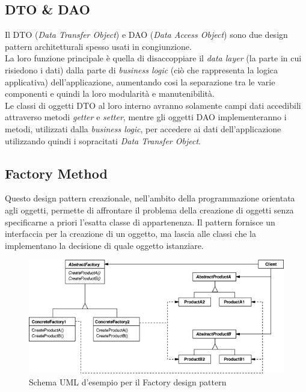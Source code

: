\documentclass[12pt,a4paper,twoside,openany,english]{book}
\begin{document}
\subsection{DTO \& DAO}
Il \gls{DTO} (\textit{Data Transfer Object}) e \gls{DAO} (\textit{Data Access Object}) sono due design pattern architetturali spesso usati in congiunzione.\\
La loro funzione principale è quella di disaccoppiare il \textit{data layer} (la parte in cui risiedono i dati) dalla parte di \textit{business logic} (ciò che rappresenta la logica applicativa) dell'applicazione, aumentando cosi la separazione tra le varie componenti e quindi la loro modularità e manutenibilità.\\
Le classi di oggetti \gls{DTO} al loro interno avranno solamente campi dati accedibili attraverso metodi \textit{getter} e \textit{setter}, mentre gli oggetti \gls{DAO} implementeranno i metodi, utilizzati dalla \textit{business logic}, per accedere ai dati dell'applicazione utilizzando quindi i sopracitati \textit{Data Transfer Object}.

\subsection{Factory Method} \label{factory}
Questo design pattern creazionale, nell'ambito della programmazione orientata agli oggetti, permette di affrontare il problema della creazione di oggetti senza specificarne a priori l'esatta classe di appartenenza.
Il pattern fornisce un interfaccia per la creazione di un oggetto, ma lascia alle classi che la implementano la decisione di quale oggetto istanziare.\\

\begin{figure}[H]
	\centering
	\includegraphics[width=\linewidth]{images/abstract_factory_structure}
	\caption{Schema UML d'esempio per il Factory design pattern}
	\label{fig:abstractfactorystructure}
\end{figure}
\end{document}
